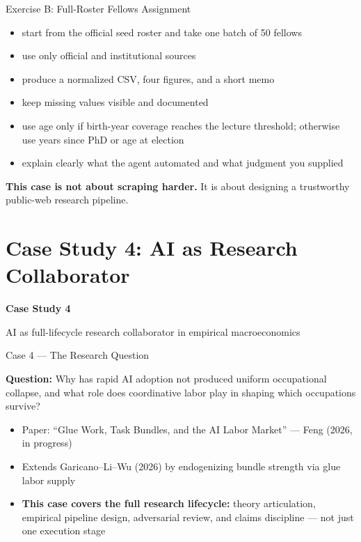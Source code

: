 \documentclass[10pt,english,aspectratio=169]{beamer}
\newcommand{\sectiondivider}[2]{%
\begin{frame}[plain,noframenumbering]
\begin{center}
\vfill
{\Large\textbf{#1}\par}
\vspace{0.35cm}
{\normalsize #2\par}
\vfill
\end{center}
\end{frame}
}
\begin{document}
\begin{frame}{Exercise B: Full-Roster Fellows Assignment}
\begin{itemize}
    \item start from the official seed roster and take one batch of 50 fellows
    \item use only official and institutional sources
    \item produce a normalized CSV, four figures, and a short memo
    \item keep missing values visible and documented
    \item use age only if birth-year coverage reaches the lecture threshold; otherwise use years since PhD or age at election
    \item explain clearly what the agent automated and what judgment you supplied
\end{itemize}

\vspace{0.3cm}
\textbf{This case is not about scraping harder.} It is about designing a trustworthy public-web research pipeline.
\end{frame}

\section{Case Study 4: AI as Research Collaborator}

\sectiondivider{Case Study 4}{AI as full-lifecycle research collaborator in empirical macroeconomics}

\begin{frame}{Case 4 --- The Research Question}
\begin{tcolorbox}[colback=blue!3, colframe=RedTitle!60]
\textbf{Question:} Why has rapid AI adoption not produced uniform occupational collapse,
and what role does coordinative labor play in shaping which occupations survive?
\end{tcolorbox}
\vspace{0.3cm}
\begin{itemize}
  \item Paper: ``Glue Work, Task Bundles, and the AI Labor Market'' --- Feng (2026, in progress)
  \item Extends Garicano--Li--Wu (2026) by endogenizing bundle strength via glue labor supply
  \item \textbf{This case covers the full research lifecycle:} theory articulation, empirical pipeline design, adversarial review, and claims discipline --- not just one execution stage
\end{itemize}
\end{frame}
\end{document}
